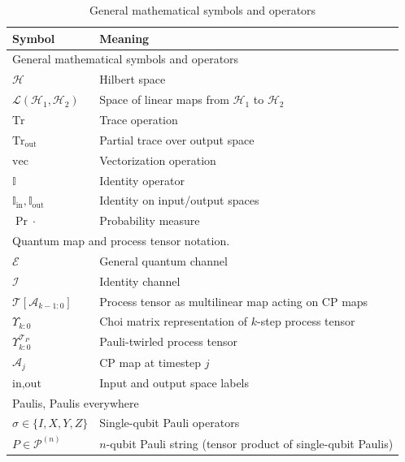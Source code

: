 \begin{table}[H]
\centering
\caption{General mathematical symbols and operators}
\begin{tabular}{ll}
\hline
\textbf{Symbol} & \textbf{Meaning} \\
\hline
\multicolumn{2}{l}{General mathematical symbols and operators} \\
\hline
\(\mathcal{H}\) & Hilbert space \\
\(\mathcal{L}(\mathcal{H}_1, \mathcal{H}_2)\) & Space of linear maps from \(\mathcal{H}_1\) to \(\mathcal{H}_2\) \\ %
\(\mathrm{Tr}\) & Trace operation  \\
\(\mathrm{Tr}_{\text{out}}\) & Partial trace over output space  \\
\(\mathrm{vec}\) & Vectorization operation  \\
\(\mathbb{I}\) & Identity operator  \\
\(\mathbb{I}_{\text{in}}, \mathbb{I}_{\text{out}}\) & Identity on input/output spaces  \\
\(\Pr{\cdot}\) & Probability measure  \\
\hline
\multicolumn{2}{l}{Quantum map and process tensor notation.} \\
\hline
\(\mathcal{E}\) & General quantum channel  \\
\(\mathcal{I}\) & Identity channel  \\
\(\mathcal{T}[\mathcal{A}_{k-1:0}]\) & Process tensor as multilinear map acting on CP maps  \\
\(\Upsilon_{k:0}\) & Choi matrix representation of \(k\)-step process tensor  \\
\(\Upsilon_{k:0}^{\mathcal{T}_P}\) & Pauli-twirled process tensor  \\
\(\mathcal{A}_j\) & CP map at timestep \(j\)  \\ %
\(\text{in}, \text{out}\) & Input and output space labels  \\
\hline
\multicolumn{2}{l}{Paulis, Paulis everywhere} \\
\hline
\(\sigma \in \{I, X, Y, Z\}\) & Single-qubit Pauli operators  \\
\(P \in \mathcal{P}^{(n)}\) & \(n\)-qubit Pauli string (tensor product of single-qubit Paulis)  \\

\end{tabular}
\end{table}
